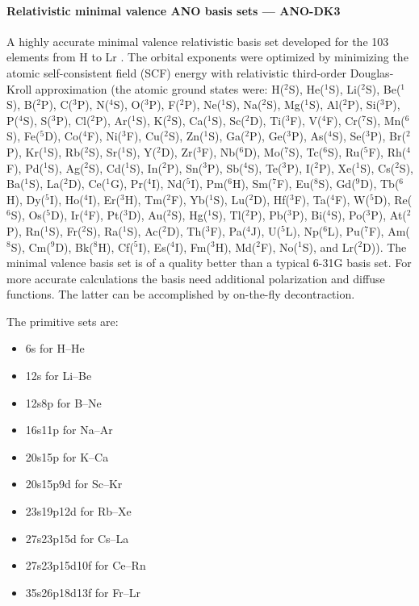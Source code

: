 \paragraph{Relativistic minimal valence ANO basis sets --- ANO-DK3}
A highly accurate minimal valence relativistic basis set developed for the 103 elements from
H to Lr \cite{ANO-DK3}. 
The orbital exponents were optimized by minimizing the atomic self-consistent field (SCF) energy
with relativistic third-order Douglas-Kroll approximation (the atomic ground states were:
H($^2$S), He($^1$S), Li($^2$S), Be($^1$S), B($^2$P), C($^3$P), N($^4$S), O($^3$P), F($^2$P),
Ne($^1$S), Na($^2$S), Mg($^1$S), Al($^2$P), Si($^3$P), P($^4$S), S($^3$P), Cl($^2$P), Ar($^1$S),
K($^2$S), Ca($^1$S), Sc($^2$D), Ti($^3$F), V($^4$F), Cr($^7$S), Mn($^6$S), Fe($^5$D), Co($^4$F),
Ni($^3$F), Cu($^2$S), Zn($^1$S), Ga($^2$P), Ge($^3$P), As($^4$S), Se($^3$P), Br($^2$P), Kr($^1$S),
Rb($^2$S), Sr($^1$S), Y($^2$D), Zr($^3$F), Nb($^6$D), Mo($^7$S), Tc($^6$S), Ru($^5$F), Rh($^4$F),
Pd($^1$S), Ag($^2$S), Cd($^1$S), In($^2$P), Sn($^3$P), Sb($^4$S), Te($^3$P), I($^2$P), Xe($^1$S),
Cs($^2$S), Ba($^1$S), La($^2$D), Ce($^1$G), Pr($^4$I), Nd($^5$I), Pm($^6$H), Sm($^7$F), Eu($^8$S),
Gd($^9$D), Tb($^6$H), Dy($^5$I), Ho($^4$I), Er($^3$H), Tm($^2$F), Yb($^1$S), Lu($^2$D), Hf($^3$F),
Ta($^4$F), W($^5$D), Re($^6$S), Os($^5$D), Ir($^4$F), Pt($^3$D), Au($^2$S), Hg($^1$S), Tl($^2$P),
Pb($^3$P), Bi($^4$S), Po($^3$P), At($^2$P), Rn($^1$S), Fr($^2$S), Ra($^1$S), Ac($^2$D), Th($^3$F),
Pa($^4$J), U($^5$L), Np($^6$L), Pu($^7$F), Am($^8$S), Cm($^9$D), Bk($^8$H), Cf($^5$I), Es($^4$I),
Fm($^3$H), Md($^2$F), No($^1$S), and Lr($^2$D)). The minimal valence basis set is of a quality better
than a typical 6-31G basis set. For more accurate calculations the basis need additional
polarization and diffuse functions. The latter can be accomplished by on-the-fly decontraction.

The primitive sets are:
\begin{itemize}
\item 6s for H--He
\item 12s for Li--Be
\item 12s8p for B--Ne
\item 16s11p for Na--Ar
\item 20s15p for K--Ca
\item 20s15p9d for Sc--Kr
\item 23s19p12d for Rb--Xe
\item 27s23p15d for Cs--La
\item 27s23p15d10f for Ce--Rn
\item 35s26p18d13f for Fr--Lr
\end{itemize}

